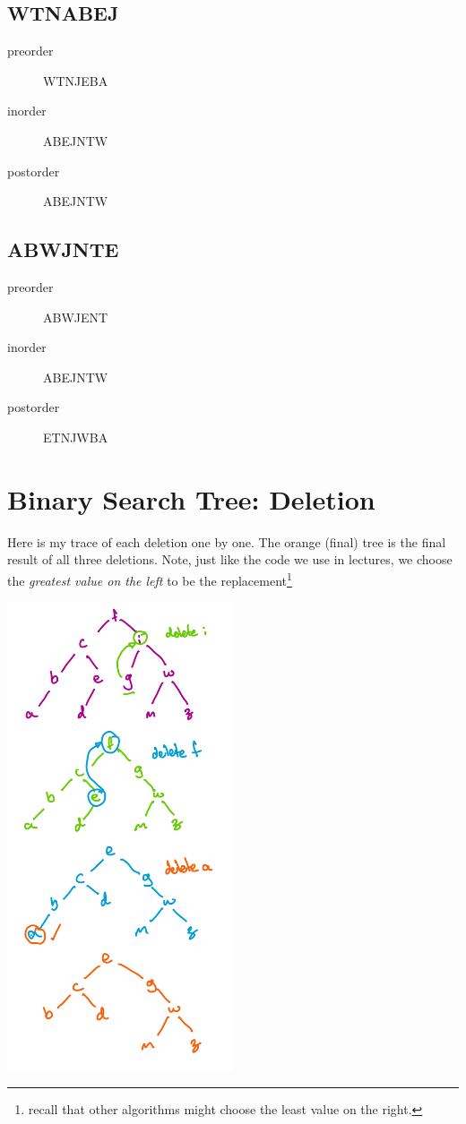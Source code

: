 \documentclass[twoside=false,DIV=14]{scrartcl}
\begin{document}
\subsection{WTNABEJ}
\begin{description}
\item [preorder] WTNJEBA
\item [inorder] ABEJNTW
\item [postorder]ABEJNTW
\end{description}

\subsection{ABWJNTE}
\begin{description}
\item [preorder] ABWJENT
\item [inorder] ABEJNTW
\item [postorder] ETNJWBA
\end{description}

\section{Binary Search Tree: Deletion}
Here is my trace of each deletion one by one.  The orange (final) tree is the final result of all three deletions.  Note, just like the code we use in lectures, we choose the \emph{greatest value on the left} to be the replacement\footnote{recall that other algorithms might choose the least value on the right.}

\begin{center}
\includegraphics[width=0.5\textwidth]{deletion.jpeg}
\end{center}
\end{document}
